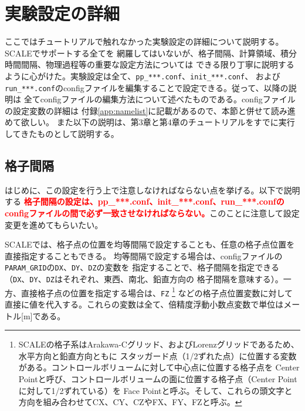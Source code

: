 
\section{実験設定の詳細} \label{sec:adv_settings}

ここではチュートリアルで触れなかった実験設定の詳細について説明する。SCALEでサポートする全てを
網羅してはいないが、格子間隔、計算領域、積分時間間隔、物理過程等の重要な設定方法については
できる限り丁寧に説明するように心がけた。実験設定は全て、\verb|pp_***.conf|、\verb|init_***.conf|、
および\verb|run_***.conf|のconfigファイルを編集することで設定できる。従って、以降の説明は
全てconfigファイルの編集方法について述べたものである。configファイルの設定変数の詳細は
付録\ref{app:namelist}に記載があるので、本節と併せて読み進めて欲しい。
また以下の説明は、第3章と第4章のチュートリアルをすでに実行してきたものとして説明する。


\subsection{格子間隔} \label{sec:adv_gridspace}
はじめに、この設定を行う上で注意しなければならない点を挙げる。以下で説明する
\textcolor{red}{\bf 格子間隔の設定は、pp\_***.conf、init\_***.conf、run\_***.confの
configファイルの間で必ず一致させなければならない。}このことに注意して設定変更を進めてもらいたい。

SCALEでは、格子点の位置を均等間隔で設定することも、任意の格子点位置を直接指定することもできる。
均等間隔で設定する場合は、configファイルの\verb|PARAM_GRID|の\verb|DX|、\verb|DY|、\verb|DZ|の変数を
指定することで、格子間隔を指定できる（\verb|DX|、\verb|DY|、\verb|DZ|はそれぞれ、東西、南北、鉛直方向の
格子間隔を意味する）。一方、直接格子点の位置を指定する場合は、\verb|FZ|
\footnote{SCALEの格子系はArakawa-Cグリッド、およびLorenzグリッドであるため、水平方向と鉛直方向ともに
スタッガード点（1/2ずれた点）に位置する変数がある。コントロールボリュームに対して中心点に位置する格子点を
Center Pointと呼び、コントロールボリュームの面に位置する格子点（Center Pointに対して1/2ずれている）を
Face Pointと呼ぶ。そして、これらの頭文字と方向を組み合わせてCX、CY、CZやFX、FY、FZと呼ぶ。}
などの格子点位置変数に対して直接に値を代入する。これらの変数は全て、倍精度浮動小数点変数で単位はメートル[m]である。

